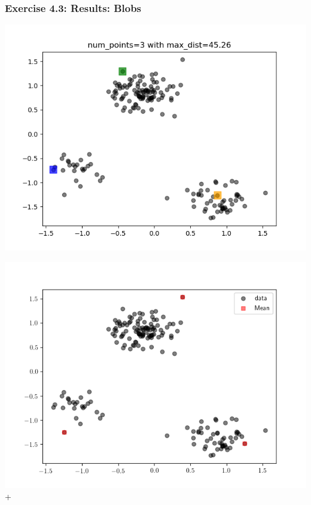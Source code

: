 \documentclass[10pt,aspectratio=169,handout]{beamer}
\begin{document}
\begin{frame}
    \frametitle{Exercise 4.3: Results: Blobs}

    \begin{minipage}{0.49\textwidth}
        \includegraphics[width=\textwidth]{images/farthest-first-blobs.png}
    \end{minipage}
    \begin{minipage}{0.49\textwidth}
        \includegraphics[width=\textwidth]{images/4-3.blobs_3.png}+
    \end{minipage}
    
\end{frame}
\end{document}
